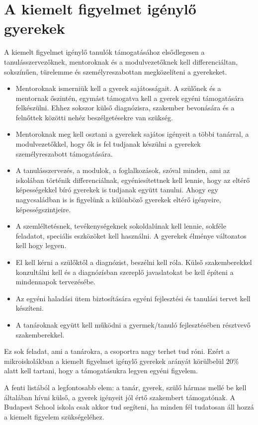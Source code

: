 \section{A kiemelt figyelmet igénylő gyerekek}
\label{sec:kiemelt_figyelem}

A kiemelt figyelmet igénylő tanulók támogatásához  elsődlegesen a tanulásszervezőknek, mentoroknak és a modulvezetőknek kell differenciáltan, sokszínűen, türelemme és személyreszabottan megközelíteni a gyerekeket.

\begin{itemize}
      \item Mentoroknak ismerniük kell a gyerek sajátosságait. A szülőnek és a mentornak őszintén, egymást támogatva kell a gyerek egyéni támogatására felkészülni. Ehhez sokszor külső diagnózisra, szakember bevonására és a felnőttek közötti nehéz beszélgetésekre van szükség.
      \item Mentoroknak meg kell osztani a gyerekek sajátos igényeit a többi tanárral, a modulvezetőkkel, hogy ők is fel tudjanak készülni a gyerekek személyreszabott támogatására.
      \item A tanulásszervezés, a modulok, a foglalkozások, szóval minden, ami az iskolában történik  differenciálnak, egyéniesítettnek kell lennie, hogy az eltérő képességekkel bíró gyerekek is tudjanak együtt tanulni. Ahogy egy nagycsaládban is is figyelünk a különböző gyerekek eltérő igényeire, képességszintjeire.
      \item A szemléltetésnek, tevékenységeknek sokoldalúnak kell lennie, sokféle feladatot, speciális eszközöket kell használni. A gyerekek élménye változatos kell hogy legyen.
      \item El kell kérni a szülőktől a diagnózist, beszélni kell róla. Külső szakemberekkel konzultálni kell és a diagnózísban szereplő javaslatokat be kell építeni a mindennapok tervezésébe.
      \item Az egyéni haladási ütem biztosítására egyéni fejlesztési és tanulási tervet kell készíteni.
      \item A tanároknak együtt kell működni a gyermek/tanuló fejlesztésében résztvevő szakemberekkel.
\end{itemize}

Ez sok feladat, ami a tanárokra, a csoportra nagy terhet tud róni. Ezért a mikroiskolákban a kiemelt figyelmet igénylő gyerekek arányát körülbelül 20\% alatt kell tartani, hogy a támogatásukra legyen egyéni figyelem.

A fenti listából a legfontosabb elem: a tanár, gyerek, szülő hármas mellé be kell általában hívni külső, a gyerek igényeit jól értő szakembert támogatónak. A Budapest School iskola csak akkor tud segíteni, ha minden fél tudatosan áll hozzá a kiemelt figyelem szükségeléhez.